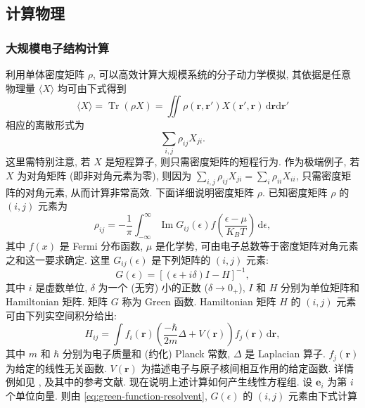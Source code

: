 \subsection{{计算物理}}\label{sec:computational-physics}
\subsubsection{{大规模电子结构计算}}\label{subsec:electronic-structure}
{利用单体密度矩阵 $\rho$, 可以高效计算大规模系统的分子动力学模拟, 其依据是任意物理量 $\langle X\rangle$ 均可由下式得到}
\[\langle X\rangle=\operatorname{Tr}(\rho X)=\iint\rho(\boldsymbol{r},\boldsymbol{r}')X(\boldsymbol{r}',\boldsymbol{r})\,\mathrm d\boldsymbol{r}\mathrm d\boldsymbol{r}'\]
{相应的离散形式为}
\[\sum_{i,j}\rho_{ij}X_{ji}.\]
{这里需特别注意, 若 $X$ 是短程算子, 则只需密度矩阵的短程行为. 作为极端例子, 若 $X$ 为对角矩阵 (即非对角元素为零), 则因为 $\sum_{i,j}\rho_{ij}X_{ji}=\sum_i\rho_{ii}X_{ii}$, 只需密度矩阵的对角元素, 从而计算非常高效.}
{下面详细说明密度矩阵 $\rho$. 已知密度矩阵 $\rho$ 的 $(i,j)$ 元素为}
\begin{equation}\label{eq:density-matrix-green-integral}
\rho_{ij}=-\frac1\pi\int_{-\infty}^{\infty}\operatorname{Im}G_{ij}(\epsilon)f\left(\frac{\epsilon-\mu}{K_BT}\right)\,\mathrm d\epsilon,
\end{equation}
{其中 $f(x)$ 是 Fermi 分布函数, $\mu$ 是化学势, 可由电子总数等于密度矩阵对角元素之和这一要求确定. 这里 $G_{ij}(\epsilon)$ 是下列矩阵的 $(i,j)$ 元素:}
\begin{equation}\label{eq:green-function-resolvent}
G(\epsilon)=[(\epsilon+i\delta)I-H]^{-1},
\end{equation}
{其中 $i$ 是虚数单位, $\delta$ 为一个 (无穷) 小的正数 ($\delta\to0_+$), $I$ 和 $H$ 分别为单位矩阵和 Hamiltonian 矩阵. 矩阵 $G$ 称为 Green 函数. Hamiltonian 矩阵 $H$ 的 $(i,j)$ 元素可由下列实空间积分给出:}
\[H_{ij}=\int f_i(\boldsymbol{r})\left(\frac{-\hbar}{2m}\Delta+V(\boldsymbol{r})\right)f_j(\boldsymbol{r})\,\mathrm d\boldsymbol{r},\]
{其中 $m$ 和 $\hbar$ 分别为电子质量和 (约化) Planck 常数, $\Delta$ 是 Laplacian 算子. $f_j(\boldsymbol{r})$ 为给定的线性无关函数. $V(\boldsymbol{r})$ 为描述电子与原子核间相互作用的给定函数. 详情例如见 ,  及其中的参考文献.}
{现在说明上述计算如何产生线性方程组. 设 $\boldsymbol{e}_i$ 为第 $i$ 个单位向量. 则由 \eqref{eq:green-function-resolvent}, $G(\epsilon)$ 的 $(i,j)$ 元素由下式计算}

